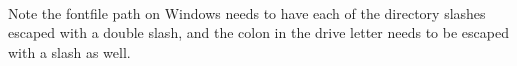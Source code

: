 \begin{fullwidth}
\\

Note the fontfile path on Windows needs to have each of the directory slashes escaped with a double slash, and the colon in the drive letter needs to be escaped with a slash as well.


\clearpage

\end{fullwidth}
